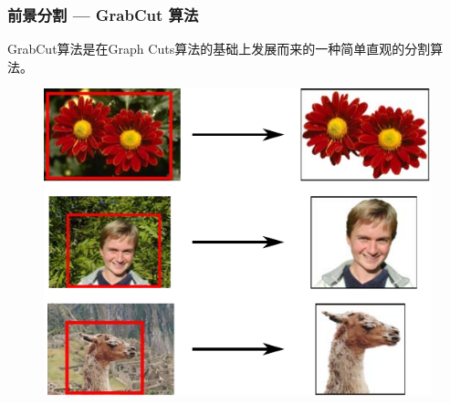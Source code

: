 \documentclass[xcolor=svgnames,serif,table,10pt]{beamer}
\begin{document}
\begin{frame}
  \frametitle{前景分割 --- GrabCut 算法}
  GrabCut算法\cite{Rother2004}是在Graph Cuts算法\cite{Boykov2001}的基础上发展而来的一种简单直观的分割算法。
  \begin{figure}
    \centering
    \includegraphics[width=.6\textwidth]{grabcut.pdf}
  \end{figure}
\end{frame}
\end{document}
